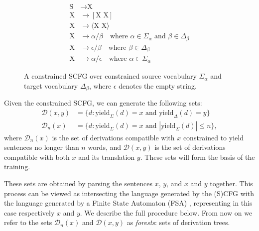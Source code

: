 \documentclass[11pt,a4paper]{article}
\begin{document}
\begin{figure}[H]
\center
\begin{align*}
    \text{S} &\to \text{X} \\
    \text{X} &\to [\text{X X}] \\
    \text{X} &\to \langle\text{X X}\rangle \\
    \text{X} &\to \alpha/\beta \quad \text{where } \alpha\in \Sigma_{\alpha} \text{ and }  \beta\in \Delta_{\beta} \\
    \text{X} &\to \epsilon/\beta \quad \text{where } \beta\in \Delta_{\beta} \\
    \text{X} &\to \alpha/\epsilon \quad \text{where } \alpha\in \Sigma_{\alpha}
\end{align*}
\caption{A constrained SCFG over constrained source vocabulary $\Sigma_{\alpha}$ and target vocabulary $\Delta_{\beta}$, where $\epsilon$ denotes the empty string.}
\label{fig:scfg}
\end{figure}
Given the constrained SCFG, we can generate the following sets:
\begin{align*}
    \mathcal{D}(x,y) &= \{d: \text{yield}_{\Sigma}(d)= x \text{ and } \text{yield}_{\Delta}(d)= y\}  \\
    \mathcal{D}_n(x) &= \{d: \text{yield}_{\Sigma}(d)= x \text{ and } |\text{yield}_{\Sigma}(d)|\leq n\},
\end{align*}
where $\mathcal{D}_{n}(x)$ is the set of derivations compatible with $x$ constrained to yield sentences no longer than $n$ words, and $\mathcal{D}(x,y)$ is the set of derivations compatible with both $x$ and its translation $y$. These sets will form the basis of the training.

These sets are obtained by parsing the sentences $x$, $y$, and $x$ and $y$ together. This process can be viewed as intersecting the language generated by the (S)CFG with the language generated by a Finite State Automaton (FSA) \cite{BarHillel61}, representing in this case respectively $x$ and $y$. We describe the full procedure below. From now on we refer to the sets $\mathcal{D}_{n}(x)$ and $\mathcal{D}(x,y)$ as \textit{forests}: sets of derivation trees.
\end{document}
